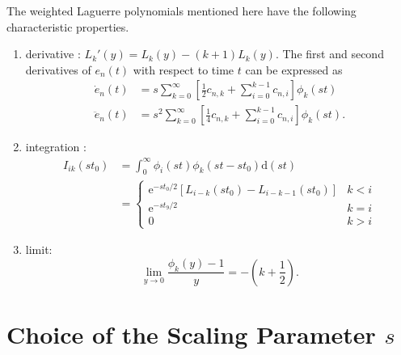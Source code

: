 \documentclass[conference, a4paper]{IEEEtran}
\begin{document}
The weighted Laguerre polynomials mentioned here have the following
characteristic properties.
\begin{enumerate}
\item derivative \cite{jung:time:2003}: $L_k'(y)=L_k(y)-(k+1)L_k(y)$. The first and second
derivatives of $e_n(t)$ with respect to time $t$ can be expressed as
\begin{equation}
\begin{split}
\dot{e}_n(t)&=s\sum _{k=0}^{\infty}\left [\frac{1}{2}c_{n,k}+\sum
_{i=0}^{k-1}c_{n,i}\right ]\phi _k(st) \\
\ddot{e}_n(t)&=s^2\sum _{k=0}^{\infty}\left [\frac{1}{4}c_{n,k}+\sum
_{i=0}^{k-1}c_{n,i}\right ]\phi _k(st).
\end{split}
\end{equation}
\item integration \cite{gradshteyn:table:1980}:
\begin{equation}
\begin{split}
I_{ik}(st_0)&=\int
_0^{\infty}\phi_i(st)\phi_k(st-st_0)\mathrm{d}(st) \\
&=\begin{cases}\mathrm{e}^{-st_0/2}[L_{i-k}(st_0)-L_{i-k-1}(st_0)]&k<i\\
    \mathrm{e}^{-st_9/2}&k=i\\
    0&k>i\end{cases}
\end{split}
\end{equation}
\item limit: 
\begin{equation}
\lim _{y\rightarrow 0}\frac{\phi_k(y)-1}{y}=-(k+\frac{1}{2}).
\end{equation}
\end{enumerate}

\section{Choice of the Scaling Parameter $s$}
\end{document}
